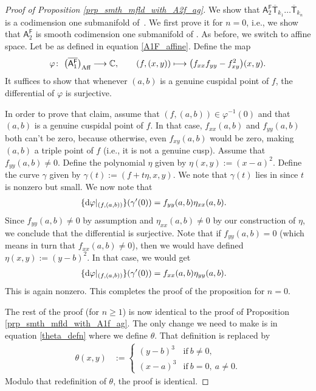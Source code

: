 \documentclass[pdftex]{sigma}
\numberwithin{equation}{section}
\begin{document}
\begin{proof}[Proof of Proposition \ref{prp_smth_mfld_with_A2f_ag}]
We show that
$\mathsf{A}^{\mathsf{F}}_2\overline{\mathsf{T}}_{k_1}\dots \overline{\mathsf{T}}_{k_n}$
is a codimension one submanifold of~.
We first prove it for $n = 0$, i.e., we show that
$\mathsf{A}^{\mathsf{F}}_2$ is smooth codimension one submanifold of
.
As before, we switch to affine space.
Let 
be as defined in equation \eqref{A1F_affine}. Define the map
\[
\varphi \colon\ \bigl(\overline{\mathsf{A}_1^{\mathsf{F}}}\bigr)_{\textnormal{Aff}} \longrightarrow \mathbb{C},\qquad
(f, (x, y)) \longmapsto \bigl(f_{xx} f_{yy} -f_{xy}^2\bigr)(x, y).
\]
It suffices to show that whenever $(a, b)$ is a genuine cuspidal point of $f$, the differential of
$\varphi$
is surjective.

In order to prove that claim,
assume that $(f, (a, b)) \in \varphi^{-1}(0)$ and that
$(a, b)$ is a genuine cuspidal point of $f$.
In that case, $f_{xx}(a, b)$ and $f_{yy}(a, b)$
both can't be zero, because otherwise, even $f_{xy}(a, b)$ would be zero, making $(a, b)$ a triple
point of $f$ (i.e., it is not a genuine cusp). Assume that $f_{yy}(a, b) \neq 0$.
Define the polynomial $\eta$ given by
$\eta(x,y):= (x-a)^2$.
Define the curve $\gamma$ given by
$\gamma(t) :=  (f+t \eta, x, y)$.
We note that $\gamma(t)$ lies in
 since $t$ is nonzero but small.
We now note that
\begin{align*}
\{{\rm d}\varphi|_{(f,(a,b))}\}(\gamma^{\prime}(0))& = f_{yy}(a,b) \eta_{xx}(a,b).
\end{align*}
Since $f_{yy}(a,b) \neq 0$ by assumption and
$\eta_{xx}(a,b) \neq 0$ by our construction of $\eta$, we conclude that the differential is surjective.
Note that if $f_{yy}(a,b)=0$ (which means in turn that $f_{xx}(a,b)\neq0$), then
we would have defined $\eta(x,y):= (y-b)^2$. In that case, we would get{\samepage
\begin{align*}
\{{\rm d}\varphi|_{(f,(a,b))}\}(\gamma^{\prime}(0))& = f_{xx}(a,b) \eta_{yy}(a,b).
\end{align*}
This is again nonzero. This completes the proof of the proposition
for $n = 0$.}

The rest of the proof (for $n \geq 1$)
is now identical to the proof of
Proposition \ref{prp_smth_mfld_with_A1f_ag}. The only change we need to make is in
equation \eqref{theta_defn} where we define $\theta$. That definition is replaced by
\begin{align}
\label{theta_defn_ag}
\theta(x,y)&:= \begin{cases} (y-b)^3 &  \text{if} \  b \neq 0, \\
              (x-a)^3 &  \text{if} \ b =0, \ a\neq 0.
       \end{cases}
\end{align}
Modulo that redefinition of $\theta$, the proof is identical.
\end{proof}
\end{document}
